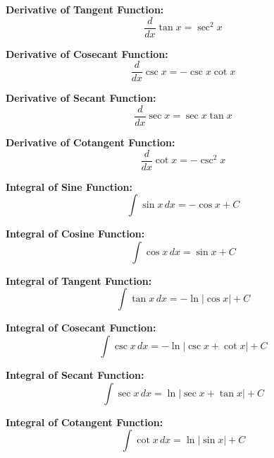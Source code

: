 \documentclass{article}
\begin{document}
\textbf{Derivative of Tangent Function:}
\[
\frac{d}{dx} \tan x = \sec^2 x
\]

\textbf{Derivative of Cosecant Function:}
\[
\frac{d}{dx} \csc x = -\csc x \cot x
\]

\textbf{Derivative of Secant Function:}
\[
\frac{d}{dx} \sec x = \sec x \tan x
\]

\textbf{Derivative of Cotangent Function:}
\[
\frac{d}{dx} \cot x = -\csc^2 x
\]

\textbf{Integral of Sine Function:}
\[
\int \sin x \, dx = -\cos x + C
\]

\textbf{Integral of Cosine Function:}
\[
\int \cos x \, dx = \sin x + C
\]

\textbf{Integral of Tangent Function:}
\[
\int \tan x \, dx = -\ln|\cos x| + C
\]

\textbf{Integral of Cosecant Function:}
\[
\int \csc x \, dx = -\ln|\csc x + \cot x| + C
\]

\textbf{Integral of Secant Function:}
\[
\int \sec x \, dx = \ln|\sec x + \tan x| + C
\]

\textbf{Integral of Cotangent Function:}
\[
\int \cot x \, dx = \ln|\sin x| + C
\]
\end{document}
